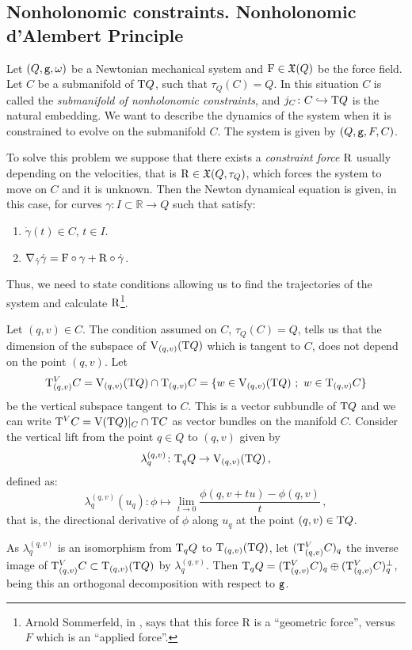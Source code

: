 \documentclass[12pt]{report}
\def\ben{\begin{enumerate}}
\def\een{\end{enumerate}}
\def\vf{\mathfrak X}
\def\Real{\mathbb{R}}
\def\Tan{{\rm T}}
\begin{document}
\subsection{Nonholonomic constraints. Nonholonomic d'Alembert Principle}
\protect\label{slnh}


Let $(Q,{\tt g},\omega)$ be a Newtonian mechanical system and ${\rm F}\in\vf (Q)$ be the force field. Let $C$ be a submanifold of $\Tan Q$,
such that $\tau_Q(C)=Q$. In this situation $C$ is called the 
 {\sl submanifold of nonholonomic constraints}, and
$j_C\colon C\hookrightarrow \Tan Q$ is the natural embedding.
We want to describe the dynamics of the system when it is constrained to evolve on the submanifold $C$. The system is given by $(Q,{\tt g},F,C)$.

To solve this problem we suppose that there exists a  {\sl constraint force}
${\rm R}$ usually depending on the velocities,  that is ${\rm R}\in\vf (Q,\tau_Q)$, which forces the system to move on $C$ and it is unknown.
Then the Newton dynamical equation is given, in this case, for curves
$\gamma\colon I\subset\Real\to Q$ such that satisfy:
\ben
\item
$\dot\gamma(t)\in C$, $ t\in I$.
\item
$\nabla_{\dot\gamma}\dot\gamma ={\rm F}\circ\gamma+{\rm R}\circ\dot\gamma$.
\een
Thus, we need to state conditions allowing us to find the trajectories of the system and calculate ${\rm R}$\footnote{Arnold Sommerfeld, in \cite{Som-1952}, says that this force $\mathrm{R}$ is a ``geometric force'', versus $F$ which is an ``applied force''.}.

Let $(q,v)\in C$. The condition assumed on $C$,
 $\tau_Q (C)=Q$, tells us that the dimension of the subspace of 
${\rm V}_{(q,v)}(\Tan Q)$ which is tangent to $C$, does not depend on the point $(q,v)$. Let
$$
\Tan_{(q,v)}^VC={\rm V}_{(q,v)}(\Tan Q)\cap\Tan_{(q,v)}C=\{ w\in{\rm V}_{(q,v)}(\Tan Q)\ ;\ w\in\Tan_{(q,v)}C\}
$$
be the vertical subspace tangent to $C$. This is a vector subbundle of $\Tan Q$ and we can write $\Tan^VC={\rm V}(\Tan Q)|_{C}\cap\Tan C$ as vector bundles on the manifold $C$.
Consider the vertical lift from the point $q\in Q$ to $(q,v)$ given by
$$
\lambda_q^{(q,v)}\colon\Tan_qQ\to{\rm V}_{(q,v)}(\Tan Q)\, ,
$$
defined as:
$$
\lambda_q^{(q,v)}(u_{q}):\phi\mapsto\lim_{t\rightarrow 0}\frac{\phi(q,v+tu)-\phi(q,v)}{t}\, ,
$$
that is, the directional derivative of $\phi$ along $u_{q}$ at the point $(q,v)\in\Tan Q$.

As $\lambda_q^{(q,v)}$ is an isomorphism from $\Tan_{q}Q$ to $\Tan_{(q,v)}(\Tan Q)$, let $(\Tan_{(q,v)}^VC)_q$ the inverse image of
$\Tan_{(q,v)}^VC\subset\Tan_{(q,v)}(\Tan Q)$ by $\lambda_q^{(q,v)}$. Then $\Tan_{q}Q=(\Tan_{(q,v)}^VC)_q\oplus(\Tan_{(q,v)}^VC)^\perp_q$, being this an orthogonal decomposition with respect to ${\tt g}$.
\end{document}
